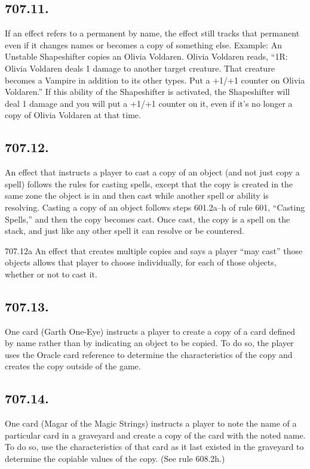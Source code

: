 \subsection*{707.11.}
If an effect refers to a permanent by name, the effect still tracks that permanent even if it changes names or becomes a copy of something else.
Example: An Unstable Shapeshifter copies an Olivia Voldaren. Olivia Voldaren reads, “{1}{R}: Olivia Voldaren deals 1 damage to another target creature. That creature becomes a Vampire in addition to its other types. Put a +1/+1 counter on Olivia Voldaren.” If this ability of the Shapeshifter is activated, the Shapeshifter will deal 1 damage and you will put a +1/+1 counter on it, even if it’s no longer a copy of Olivia Voldaren at that time.

\subsection*{707.12.}
An effect that instructs a player to cast a copy of an object (and not just copy a spell) follows the rules for casting spells, except that the copy is created in the same zone the object is in and then cast while another spell or ability is resolving. Casting a copy of an object follows steps 601.2a–h of rule 601, “Casting Spells,” and then the copy becomes cast. Once cast, the copy is a spell on the stack, and just like any other spell it can resolve or be countered.

707.12a An effect that creates multiple copies and says a player “may cast” those objects allows that player to choose individually, for each of those objects, whether or not to cast it.

\subsection*{707.13.}
One card (Garth One-Eye) instructs a player to create a copy of a card defined by name rather than by indicating an object to be copied. To do so, the player uses the Oracle card reference to determine the characteristics of the copy and creates the copy outside of the game.

\subsection*{707.14.}
One card (Magar of the Magic Strings) instructs a player to note the name of a particular card in a graveyard and create a copy of the card with the noted name. To do so, use the characteristics of that card as it last existed in the graveyard to determine the copiable values of the copy. (See rule 608.2h.)

